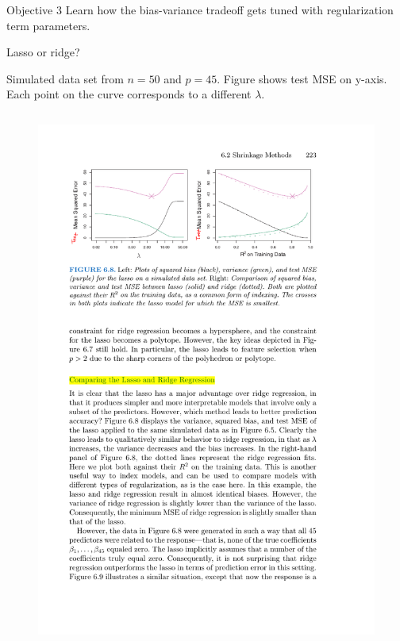 \documentclass[mathserif, handout, aspectratio=169]{beamer}
\begin{document}
\begin{frame}{Objective 3}
Learn how the bias-variance tradeoff gets tuned with regularization term parameters. 
\end{frame}

\begin{frame}{Lasso or ridge?}

Simulated data set from $n=50$ and $p=45$. Figure shows test MSE on y-axis.  Each point on the curve corresponds to a different $\lambda$.
\begin{columns}
\begin{figure}
\includegraphics[scale=1]{lasso-v-ridge-45variables}
\end{figure}

\vspace{-10mm}


\end{columns}
\end{frame}
\end{document}
